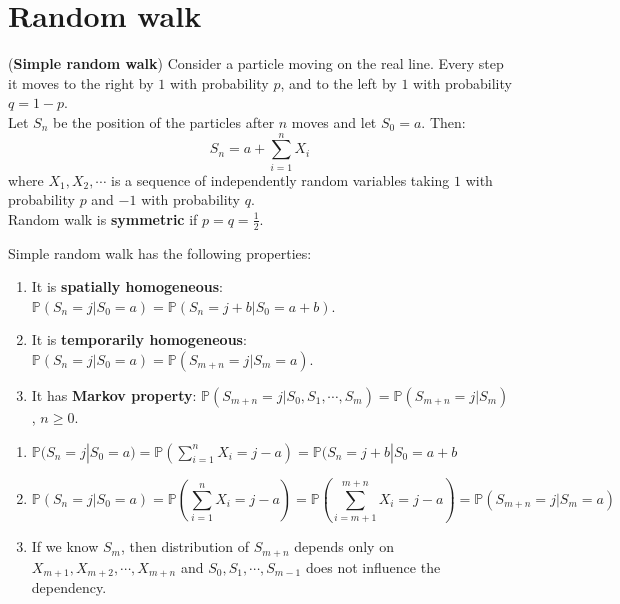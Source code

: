 \documentclass{huhtakm-template-book}
\newcommand{\prob}{\mathbb{P}}
\begin{document}
\appendix
\renewcommand{\thechapter}{\Alph{chapter}}

\chapter{Random walk}
\label{Simple random walk}
\begin{eg}(\textbf{Simple random walk})
	Consider a particle moving on the real line. Every step it moves to the right by $1$ with probability $p$, and to the left by $1$ with probability $q=1-p$.\\
	Let $S_{n}$ be the position of the particles after $n$ moves and let $S_{0}=a$. Then:
	\begin{equation*}
		S_{n}=a+\sum_{i=1}^{n}X_{i}
	\end{equation*}
	where $X_{1},X_{2},\cdots$ is a sequence of independently random variables taking $1$ with probability $p$ and $-1$ with probability $q$.\\
	Random walk is \textbf{symmetric} if $p=q=\frac{1}{2}$.
\end{eg}
\begin{lem}
	\label{Simple random walk properties}
	Simple random walk has the following properties:
	\begin{enumerate}
		\item It is \textbf{spatially homogeneous}: $\prob(S_{n}=j|S_{0}=a)=\prob(S_{n}=j+b|S_{0}=a+b)$.
		\item It is \textbf{temporarily homogeneous}: $\prob(S_{n}=j|S_{0}=a)=\prob(S_{m+n}=j|S_{m}=a)$.
		\item It has \textbf{Markov property}: $\prob(S_{m+n}=j|S_{0},S_{1},\cdots,S_{m})=\prob(S_{m+n}=j|S_{m})$, $n\geq 0$.
	\end{enumerate}
\end{lem}
\begin{proofing}
	\begin{enumerate}
		\item $\prob(S_{n}=j|S_{0}=a)=\prob(\sum_{i=1}^{n}X_{i}=j-a)=\prob(S_{n}=j+b|S_{0}=a+b$
		\item 
		\begin{equation*}
			\prob(S_{n}=j|S_{0}=a)=\prob\left(\sum_{i=1}^{n}X_{i}=j-a\right)=\prob\left(\sum_{i=m+1}^{m+n}X_{i}=j-a\right)=\prob(S_{m+n}=j|S_{m}=a)
		\end{equation*}
		\item If we know $S_{m}$, then distribution of $S_{m+n}$ depends only on $X_{m+1},X_{m+2},\cdots,X_{m+n}$ and $S_{0},S_{1},\cdots,S_{m-1}$ does not influence the dependency.
	\end{enumerate}
\end{proofing}
\end{document}
